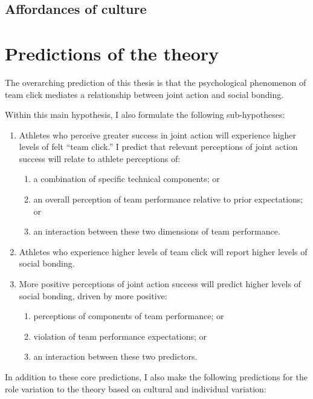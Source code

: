 \begin{CJK}{UTF8}{gbsn}
\subsection{Affordances of culture}










\section{Predictions of the theory}


    The overarching prediction of this thesis is that the psychological phenomenon of team click mediates a relationship between joint action and social bonding.

    Within this main hypothesis, I also formulate the following sub-hypotheses:
    \begin{enumerate}
      \item Athletes who perceive greater success in joint action will experience higher levels of felt ``team click.'' I predict that relevant perceptions of joint action success will relate to athlete perceptions of:
        \begin{enumerate}
          \item a combination of specific technical components; or
          \item an overall perception of team performance relative to prior expectations; or
          \item an interaction between these two dimensions of team performance.
        \end{enumerate}
      \item Athletes who experience higher levels of team click will report higher levels of social bonding.
      \item More positive perceptions of joint action success will predict higher levels of social bonding, driven by more positive:
      \begin{enumerate}
        \item perceptions of components of team performance; or
        \item violation of team performance expectations; or
        \item an interaction between these two predictors.
      \end{enumerate}
    \end{enumerate}

In addition to these core predictions, I also make the following predictions for the role variation to the theory based on cultural and individual variation:


\end{CJK}

